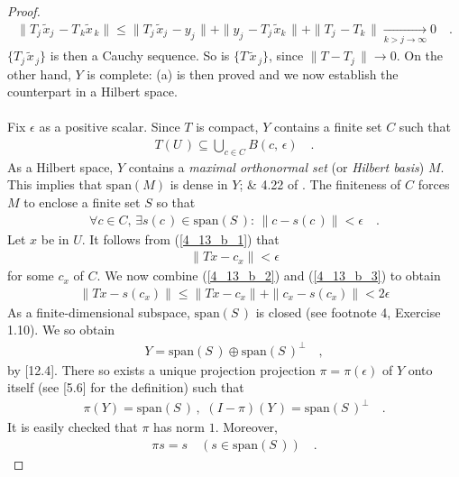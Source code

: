 \begin{proof}
\begin{align}
\| T_{j\,} \tilde{x}_{j\,}  -T_{\, k} \tilde{x}_{\, k}\| \leq
\| T_{j\,} \tilde{x}_{j\,}- y_{j\,}\| +
\| y_{j\,} -T_{j\,} \tilde{x}_{k\,}\| +
\| T_{j\,} - T_{ k\,}\|   \underset{k> j\to \infty}{\longrightarrow}0\quad .
\end{align}
$\{T_{ j\,} \tilde{x}_{\, j} \}$ is then a Cauchy sequence. So is $\{T \,\tilde{x}_{\, j}\}$, since $\| T-T_{j}\,\| \to 0$. On the other hand, $Y$ is complete: (a) is then proved and we now establish the counterpart in a Hilbert space.\\
\\
Fix $\epsilon$ as a positive scalar. Since $T$ is compact, $Y$ contains a finite set $C$ such that 
\begin{align}\label{4_13_b_1}
T(U\,)\subseteq \bigcup_{c\in C} B(c,\, \epsilon)\quad .
\end{align}
As a Hilbert space, $Y$ contains a \textsl{maximal orthonormal set} (or \textsl{Hilbert basis}) $M$. This implies that $\text{span}(M)$ is dense in $Y$;  \& 4.22 of \cite{BigRudin}. The finiteness of $C$ forces $M$ to enclose a finite set $S$ so that 
\begin{align}\label{4_13_b_2}
\forall c\in C, \, \exists  s(c\,) \in \text{span} (S\,):\, \|c - s(c\,)\| <\epsilon\quad .
\end{align}
Let $x$ be in $U$. It follows from (\ref{4_13_b_1}) that 
\begin{align}\label{4_13_b_3}
\|Tx - c_x \| < \epsilon
\end{align}
for some $c_x$ of $C$. We now combine (\ref{4_13_b_2}) and (\ref{4_13_b_3}) to obtain
\begin{align}
\|Tx - s(c_x) \| \leq  \| Tx - c_x \| + \| c_x - s(c_x)\| < 2\epsilon
\end{align}
As a finite-dimensional subspace, $\text{span}(S\,)$ is closed (see footnote 4, Exercise 1.10). We so obtain
\begin{align}
Y=\text{span}(S\,)\oplus \text{span}(S\,)^\bot \quad ,
\end{align}
by [12.4]. There so exists a unique projection projection $\pi=\pi(\epsilon)$ of $Y$ onto itself (see [5.6] for the definition) such that
\begin{align}
\pi (Y) = \text{span}(S\,)\, ,\,  \,  (I-\pi)(Y\,) = \text{span}(S\,)^\bot\quad .
\end{align}
It is easily checked that $\pi$ has norm $1$. Moreover,
\begin{align}
\pi s = s \quad (s\in\text{span}(S\,))\quad .
\end{align}

\end{proof}

